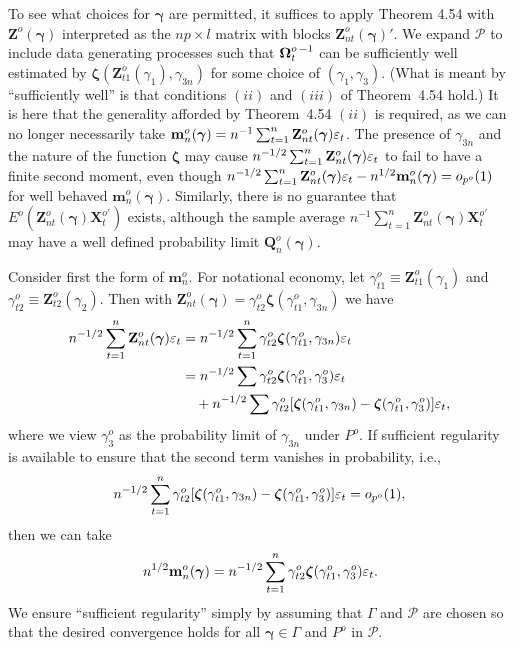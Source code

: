 To see what choices for $\boldsymbol{\gamma}$ are permitted, it suffices to apply Theorem
4.54 with $\mathbf{Z}^o(\boldsymbol{\gamma})$ interpreted as the $np \times l$ matrix with blocks $\mathbf{Z}_{nt}^o(\boldsymbol{\gamma})'$. We
expand $\mathcal{P}$ to include data generating processes such that $\boldsymbol{\Omega}_t^{o\,-1}$ can be
sufficiently well estimated by $\boldsymbol{\zeta}(\mathbf{Z}_{t1}^o(\gamma_1), \gamma_{3n})$ for some choice of $(\gamma_1, \gamma_3)$.
(What is meant by ``sufficiently well'' is that conditions $(ii)$ and $(iii)$
of Theorem~4.54 hold.) It is here that the generality afforded by Theorem~4.54 $(ii)$ is required, as we can no longer necessarily take $\mathbf{m}_n^o(\boldsymbol{\gamma}) =
n^{-1}\sum_{t=1}^{n}\mathbf{Z}_{nt}^o(\boldsymbol{\gamma})\varepsilon_t$. The presence of $\gamma_{3n}$ and the nature of the function
$\boldsymbol{\zeta}$ may cause $n^{-1/2}\sum_{t=1}^{n}\mathbf{Z}_{nt}^o(\boldsymbol{\gamma})\varepsilon_t$ to fail to have a finite second moment,
even though $n^{-1/2}\sum_{t=1}^{n}\mathbf{Z}_{nt}^o(\boldsymbol{\gamma})\varepsilon_t - n^{1/2}\mathbf{m}_n^o(\boldsymbol{\gamma}) = o_{p^o}(1)$ for well behaved
$\mathbf{m}_n^o(\boldsymbol{\gamma})$. Similarly, there is no guarantee that $E^o(\mathbf{Z}_{nt}^o(\boldsymbol{\gamma})\mathbf{X}_t^{o\prime})$ exists, although the sample average $n^{-1}\sum_{t=1}^{n}\mathbf{Z}_{nt}^o(\boldsymbol{\gamma})\mathbf{X}_t^{o\prime}$ may have a well defined
probability limit $\mathbf{Q}_n^o(\boldsymbol{\gamma})$.

Consider first the form of $\mathbf{m}_n^o$. For notational economy, let $\gamma_{t1}^o \equiv \mathbf{Z}_{t1}^o(\gamma_1)$
and $\gamma_{t2}^o \equiv \mathbf{Z}_{t2}^o(\gamma_2)$. Then with
$\mathbf{Z}_{nt}^o(\boldsymbol{\gamma}) = \gamma_{t2}^o\boldsymbol{\zeta}(\gamma_{t1}^o, \gamma_{3n})$ we have
\begin{align*}
n^{-1/2}\sum_{t=1}^{n}\mathbf{Z}_{nt}^o(\boldsymbol{\gamma})\varepsilon_t &= n^{-1/2}\sum_{t=1}^{n}\gamma_{t2}^o\boldsymbol{\zeta}(\gamma_{t1}^o, \gamma_{3n})\varepsilon_t\\
&= n^{-1/2}\sum \gamma_{t2}^o\boldsymbol{\zeta}(\gamma_{t1}^o, \gamma_3^o)\varepsilon_t\\
&\quad + n^{-1/2}\sum \gamma_{t2}^o[\boldsymbol{\zeta}(\gamma_{t1}^o, \gamma_{3n}) - \boldsymbol{\zeta}(\gamma_{t1}^o, \gamma_3^o)]\varepsilon_t,
\end{align*}
where we view $\gamma_3^o$ as the probability limit of $\gamma_{3n}$ under $P^o$. If sufficient
regularity is available to ensure that the second term vanishes in probability,
i.e.,
\[
n^{-1/2}\sum_{t=1}^{n}\gamma_{t2}^o[\boldsymbol{\zeta}(\gamma_{t1}^o, \gamma_{3n}) - \boldsymbol{\zeta}(\gamma_{t1}^o, \gamma_3^o)]\varepsilon_t = o_{p^o}(1),
\]
then we can take
\[
n^{1/2}\mathbf{m}_n^o(\boldsymbol{\gamma}) = n^{-1/2}\sum_{t=1}^{n}\gamma_{t2}^o\boldsymbol{\zeta}(\gamma_{t1}^o, \gamma_3^o)\varepsilon_t.
\]
We ensure ``sufficient regularity'' simply by assuming that $\Gamma$ and $\mathcal{P}$ are
chosen so that the desired convergence holds for all $\boldsymbol{\gamma} \in \Gamma$ and $P^o$ in $\mathcal{P}$.

